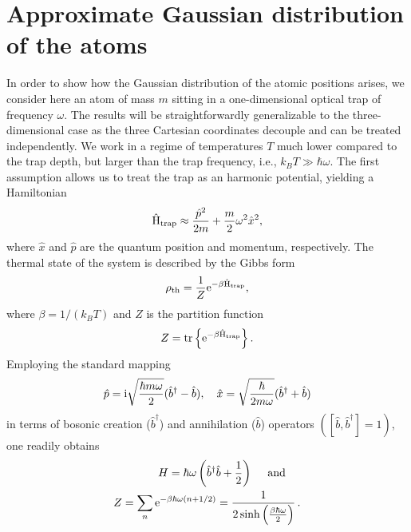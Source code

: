 \documentclass[prl,aps,twocolumn,showpacs,superscriptaddress,longbibliography]{revtex4-1}
\newcommand{\be}{\begin{equation}}
\newcommand{\ee}{\end{equation}}
\newcommand{\rmi}{{\rm{i}}}
\newcommand{\rme}[1]{{\rm{e}}^{#1}}
\newcommand{\mand}{\quad\text{ and }\quad}
\newcommand{\trace}[1]{{\rm tr}\left\{ #1 \right\}}
\newcommand{\ha}{\frac{1}{2}}
\newcommand{\lt}{\left(}
\newcommand{\rt}{\right)}
\newcommand{\comm}[2]{\left[ #1, #2 \right]}
\newcommand{\sinha}[1]{\sinh \left(  #1 \right)}
\newcommand{\op}[1]{\mathrm{\hat{#1}}}
\begin{document}
\section{Approximate Gaussian distribution of the atoms} 
In order to show how the Gaussian distribution of the atomic positions arises, we consider here an atom of mass $m$ sitting in a one-dimensional optical trap of frequency $\omega$. The results will be straightforwardly generalizable to the three-dimensional case as the three Cartesian coordinates decouple and can be treated independently.
We work in a regime of temperatures $T$ much lower compared to the trap depth, but larger than the trap frequency, i.e., $k_B T \gg \hbar \omega$. The first assumption allows us to treat the trap as an harmonic potential, yielding a Hamiltonian
\be
	\op H_{\rm trap} \approx \frac{\hat{p}^2}{2m} + \frac{m}{2} \omega^2 \hat{x}^2,
\ee
where $\hat{x}$ and $\hat{p}$ are the quantum position and momentum, respectively. The thermal state of the system is described by the Gibbs form
\be
	\rho_{\rm th} = \frac{1}{Z} \rme{-\beta \op H_{\rm trap}},
\ee
where $\beta = 1/ (k_B T)$ and $Z$ is the partition function
\be
	Z = \trace{ \rme{-\beta \op H_{\rm trap}}}.
	\label{eq:part}
\ee
Employing the standard mapping
\be
	\hat{p} = \rmi \sqrt{\frac{\hbar m \omega}{2}} (\hat{b}^\dag - \hat{b}), \quad \hat{x} = \sqrt{\frac{\hbar }{2m \omega}} (\hat{b}^\dag + \hat{b})
\ee
in terms of bosonic creation ($\hat{b}^\dag $) and annihilation ($\hat{b} $) operators $\left(\comm{\hat{b}}{\hat{b}^\dag} = 1\right)$, one readily obtains
\begin{subequations}
\begin{align}
	H = \hbar \omega \lt \hat{b}^\dag \hat{b} + \ha \rt \mand \\
	Z = \sum_n \rme{-\beta \hbar \omega (n + 1/2)} = \frac{1}{2 \sinha{\frac{\beta \hbar \omega}{2}}}\, .
\end{align}
\end{subequations}
\end{document}
